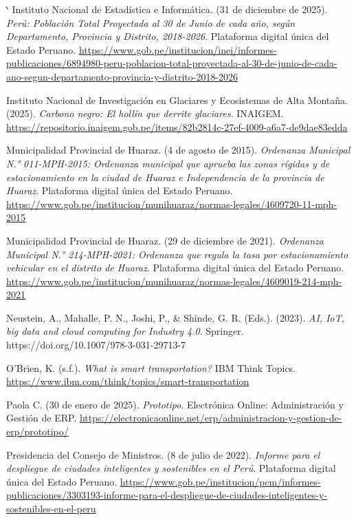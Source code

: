 \documentclass[12pt,a4paper]{article}
\makeatletter
\renewenvironment{thebibliography}[1]{%
	\list{}{%
		\setlength{\leftmargin}{1.27cm}%
		\setlength{\itemindent}{-1.27cm}%
		\setlength{\labelwidth}{0pt}%
		\setlength{\labelsep}{0pt}%
		\usecounter{enumiv}%
		\let\p@enumiv\@empty
		\renewcommand\theenumiv{\@arabic\c@enumiv}}%
	\sloppy\clubpenalty4000\widowpenalty4000\sfcode`\.\@m}
	{\endlist}
\makeatother
\begin{document}
\begin{thebibliography}{99}
	Instituto Nacional de Estadística e Informática. (31 de diciembre de 2025).
	\textit{Perú: Población Total Proyectada al 30 de Junio de cada año, según Departamento, Provincia y Distrito, 2018-2026}.
	Plataforma digital única del Estado Peruano.
	\url{https://www.gob.pe/institucion/inei/informes-publicaciones/6894980-peru-poblacion-total-proyectada-al-30-de-junio-de-cada-ano-segun-departamento-provincia-y-distrito-2018-2026}
	
	Instituto Nacional de Investigación en Glaciares y Ecosistemas de Alta Montaña. (2025).
	\textit{Carbono negro: El hollín que derrite glaciares}.
	INAIGEM.
	\url{https://repositorio.inaigem.gob.pe/items/82b2814c-27ef-4009-a6a7-de9dae83edda}
	
	Municipalidad Provincial de Huaraz. (4 de agosto de 2015).
	\textit{Ordenanza Municipal N.° 011-MPH-2015: Ordenanza municipal que aprueba las zonas rígidas y de estacionamiento en la ciudad de Huaraz e Independencia de la provincia de Huaraz}.
	Plataforma digital única del Estado Peruano.
	\url{https://www.gob.pe/institucion/munihuaraz/normas-legales/4609720-11-mph-2015}
	
	Municipalidad Provincial de Huaraz. (29 de diciembre de 2021).
	\textit{Ordenanza Municipal N.° 214-MPH-2021: Ordenanza que regula la tasa por estacionamiento vehicular en el distrito de Huaraz}.
	Plataforma digital única del Estado Peruano.
	\url{https://www.gob.pe/institucion/munihuaraz/normas-legales/4609019-214-mph-2021}
	
	Neustein, A., Mahalle, P. N., Joshi, P., \& Shinde, G. R. (Eds.). (2023).
	\textit{AI, IoT, big data and cloud computing for Industry 4.0}.
	Springer.
	https://doi.org/10.1007/978-3-031-29713-7
	
	O'Brien, K. (s.f.).
	\textit{What is smart transportation?}
	IBM Think Topics.
	\url{https://www.ibm.com/think/topics/smart-transportation}
	
	Paola C. (30 de enero de 2025).
	\textit{Prototipo}.
	Electrónica Online: Administración y Gestión de ERP.
	\url{https://electronicaonline.net/erp/administracion-y-gestion-de-erp/prototipo/}
	
	Presidencia del Consejo de Ministros. (8 de julio de 2022).
	\textit{Informe para el despliegue de ciudades inteligentes y sostenibles en el Perú}.
	Plataforma digital única del Estado Peruano.
	\url{https://www.gob.pe/institucion/pcm/informes-publicaciones/3303193-informe-para-el-despliegue-de-ciudades-inteligentes-y-sostenibles-en-el-peru}
	

\end{thebibliography}
\end{document}
